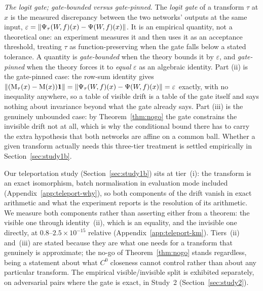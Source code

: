 \begin{clarifybox}
\emph{The logit gate; gate-bounded versus gate-pinned.} The \emph{logit gate}
of a transform $\tau$ at $x$ is the measured discrepancy between the two
networks' outputs at the same input,
$\varepsilon=\|\Psi_\tau(W\!,f)(x)-\Psi(W\!,f)(x)\|$. It is an empirical quantity, not a
theoretical one: an experiment measures it and then uses it as an acceptance
threshold, treating $\tau$ as function-preserving when the gate falls below a
stated tolerance. A quantity is \emph{gate-bounded} when the theory bounds it
by $\varepsilon$, and \emph{gate-pinned} when the theory forces it to
\emph{equal} $\varepsilon$ as an algebraic identity. Part (ii) is the
gate-pinned case: the row-sum identity gives
$\|(\mathrm{M}_\tau(x)-\mathrm{M}(x))\mathbf 1\|=\|\Psi_\tau(W\!,f)(x)-\Psi(W\!,f)(x)\|=\varepsilon$ exactly, with
no inequality anywhere, so a table of visible drift is a table of the gate
itself and says nothing about invariance beyond what the gate already says.
Part (iii) is the genuinely unbounded case: by Theorem~\ref{thm:nogo} the gate
constrains the invisible drift not at all, which is why the conditional bound
there has to carry the extra hypothesis that both networks are affine on a
common ball. Whether a given transform actually needs this three-tier
treatment is settled empirically in Section~\ref{sec:study1b}.
\end{clarifybox}

Our teleportation study (Section~\ref{sec:study1b}) sits at tier~(i): the
transform is an exact isomorphism, batch normalisation in evaluation mode
included (Appendix~\ref{app:teleport-why}), so both components of the drift
vanish in exact arithmetic and what the experiment reports is the resolution of
its arithmetic. We measure both components rather than asserting either from a
theorem: the visible one through identity~(ii), which is an equality, and the
invisible one directly, at $0.8$--$2.5\times10^{-15}$ relative
(Appendix~\ref{app:teleport-km}). Tiers~(ii) and~(iii) are stated because they
are what one needs for a transform that genuinely is approximate; the no-go of
Theorem~\ref{thm:nogo} stands regardless, being a statement about what $C^0$
closeness cannot control rather than about any particular transform. The empirical
visible/invisible split is exhibited separately, on adversarial pairs where the
gate is exact, in Study~2 (Section~\ref{sec:study2}).
